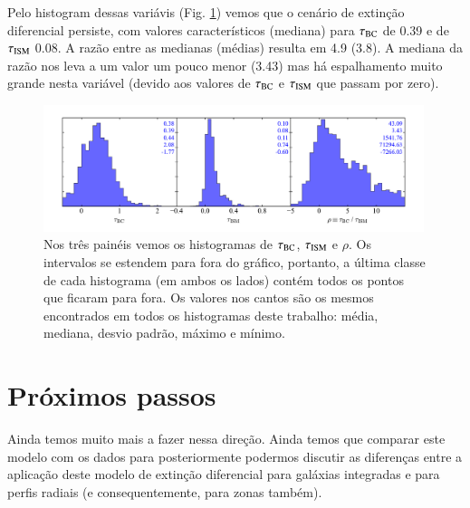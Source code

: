 Pelo histogram dessas variávis (Fig. \ref{fig:tauBCISM}) vemos que o cenário de extinção diferencial
persiste, com valores característicos (mediana) para $\tauBC$ de 0.39 e de $\tauISM$ 0.08. A razão
entre as medianas (médias) resulta em 4.9 (3.8). A mediana da razão nos leva a um valor um pouco
menor (3.43) mas há espalhamento muito grande nesta variável (devido aos valores de $\tauBC$ e
$\tauISM$ que passam por zero). 

\begin{figure}
	\centering
	\includegraphics[width=0.99\textwidth]{figuras/tauISMBC_R.pdf}
	\caption[Histogramas de $\tauBC$, $\tauISM$ e $\rho$.]
	{Nos três painéis vemos os histogramas de $\tauBC$, $\tauISM$ e $\rho$. Os intervalos se estendem
para fora do gráfico, portanto, a última classe de cada histograma (em ambos os lados) contém todos
os pontos que ficaram para fora. Os valores nos cantos são os mesmos encontrados em todos os
histogramas deste trabalho: média, mediana, desvio padrão, máximo e mínimo.}
	\label{fig:tauBCISM}
\end{figure}

\section{Próximos passos}
\label{sec:difextin:nextsteps}

Ainda temos muito mais a fazer nessa direção. Ainda temos que comparar este modelo com os dados
para posteriormente podermos discutir as diferenças entre a aplicação deste modelo de extinção
diferencial para galáxias integradas e para perfis radiais (e consequentemente, para zonas também).

